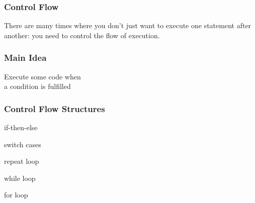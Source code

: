\documentclass[12pt]{beamer}\usepackage[]{graphicx}\usepackage[]{color}
\begin{document}

\begin{frame}
\begin{center}
\Huge{}
\end{center}
\end{frame}


\begin{frame}
\frametitle{Control Flow}

There are many times where you don't just want to execute one statement after another: you need to control the flow of execution.

\end{frame}


\begin{frame}
\frametitle{Main Idea}

\begin{center}
{\mdlit \Large Execute some code when \\ a condition is fulfilled}
\end{center}

\end{frame}


\begin{frame}
\frametitle{Control Flow Structures}

\bi
  \item if-then-else
  \item switch cases
  \item repeat loop
  \item while loop
  \item for loop
\ei

\end{frame}


\begin{frame}
\begin{center}
\Huge{}
\end{center}
\end{frame}

\end{document}
